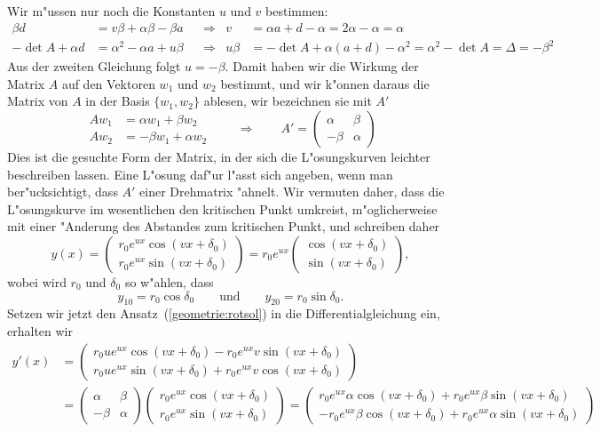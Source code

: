 Wir m"ussen nur noch die Konstanten $u$ und $v$ bestimmen:
\begin{align*}
\beta d
&=
v\beta
+
\alpha\beta
-
\beta a
&&\Rightarrow&
v
&=
\alpha a+d-\alpha=2\alpha-\alpha=\alpha
\\
-\det A +\alpha d
&=
\alpha^2- \alpha a+u\beta
&&\Rightarrow&
u\beta&=-\det A +\alpha(a+d)-\alpha^2
=\alpha^2-\det A
=\Delta=-\beta^2
\end{align*}
Aus der zweiten Gleichung folgt $ u=-\beta$.
Damit haben wir die Wirkung der Matrix $A$ auf den Vektoren $w_1$ und $w_2$
bestimmt, und wir k"onnen daraus die Matrix von $A$ in der Basis
$\{w_1,w_2\}$ ablesen, wir bezeichnen sie mit $A'$
\[
\begin{aligned}
Aw_1&=\alpha w_1 + \beta w_2\\
Aw_2&=-\beta w_1 + \alpha w_2
\end{aligned}
\qquad\Rightarrow\qquad
A'=\begin{pmatrix}
\alpha&\beta\\
-\beta&\alpha
\end{pmatrix}
\]
Dies ist die gesuchte Form der Matrix, in der sich die L"osungskurven
leichter beschreiben lassen.
Eine L"osung daf"ur l"asst sich angeben, wenn man ber"ucksichtigt, dass
$A'$ einer Drehmatrix "ahnelt.
Wir vermuten daher, dass die L"osungskurve im wesentlichen den kritischen
Punkt umkreist, m"oglicherweise mit einer "Anderung des Abstandes
zum kritischen Punkt, und schreiben daher
\begin{equation}
y(x)
=
\begin{pmatrix}
r_0e^{ux}\cos(vx+\delta_0)\\
r_0e^{ux}\sin(vx+\delta_0)
\end{pmatrix}
=
r_0e^{ux}
\begin{pmatrix}
\cos(vx+\delta_0)\\
\sin(vx+\delta_0)
\end{pmatrix}
,
\label{geometrie:rotsol}
\end{equation}
wobei wird $r_0$ und $\delta_0$ so w"ahlen, dass
\[
y_{10}=r_0\cos\delta_0
\qquad\text{und}\qquad
y_{20}=r_0\sin\delta_0.
\]
Setzen wir jetzt den Ansatz~(\ref{geometrie:rotsol}) in die
Differentialgleichung ein, erhalten wir
\begin{align*}
y'(x)
&=
\begin{pmatrix}
r_0ue^{ux}\cos(vx+\delta_0)-r_0e^{ux}v\sin(vx+\delta_0)\\
r_0ue^{ux}\sin(vx+\delta_0)+r_0e^{ux}v\cos(vx+\delta_0)
\end{pmatrix}
\\
&=
\begin{pmatrix}
 \alpha&\beta\\
-\beta &\alpha
\end{pmatrix}
\begin{pmatrix}
r_0e^{ux}\cos(vx+\delta_0)\\
r_0e^{ux}\sin(vx+\delta_0)
\end{pmatrix}
=
\begin{pmatrix}
r_0e^{ux}\alpha\cos(vx+\delta_0)+r_0e^{ux}\beta\sin(vx +\delta_0)\\
-r_0e^{ux}\beta\cos(vx+\delta_0)+r_0e^{ux}\alpha\sin(vx+\delta_0)
\end{pmatrix}
\end{align*}
